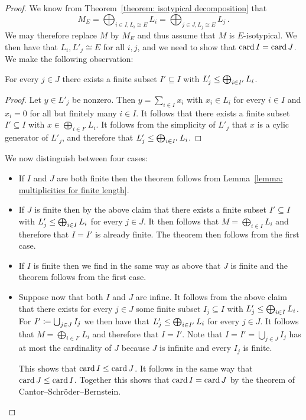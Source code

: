 \begin{proof}
  We know from Theorem~\ref{theorem: isotypical decomposition} that
  \[
      M_E
    = \bigoplus_{i \in I, L_i \cong E} L_i
    = \bigoplus_{j \in J, L_j \cong E} L_j \,.
  \]
  We may therefore replace $M$ by $M_E$ and thus assume that $M$ is $E$-isotypical.
  We then have that $L_i, L'_j \cong E$ for all $i, j$, and we need to show that $\operatorname{card}{I} = \operatorname{card}{J}$.
  We make the following observation:
  
  \begin{claim}
    For every $j \in J$ there exists a finite subset $I' \subseteq I$ with $L'_j \leq \bigoplus_{i \in I'} L_i$.
  \end{claim}
  
  \begin{proof}
    Let $y \in L'_j$ be nonzero.
    Then $y = \sum_{i \in I} x_i$ with $x_i \in L_i$ for every $i \in I$ and $x_i = 0$ for all but finitely many $i \in I$.
    It follows that there exists a finite subset $I' \subseteq I$ with $x \in \bigoplus_{i \in I'} L_i$.
    It follows from the simplicity of $L'_j$ that $x$ is a cylic generator of $L'_j$, and therefore that $L'_j \leq \bigoplus_{i \in I'} L_i$.
  \end{proof}
  
  We now distinguish between four cases:
  \begin{itemize}
    \item 
      If $I$ and $J$ are both finite then the theorem follows from Lemma~\ref{lemma: multiplicities for finite length}.
    \item
      If $J$ is finite then by the above claim that there exists a finite subset $I' \subseteq I$ with $L'_j \leq \bigoplus_{i \in I} L_i$ for every $j \in J$.
      It then follows that $M = \bigoplus_{i \in I} L_i$ and therefore that $I = I'$ is already finite.
      The theorem then follows from the first case.
    \item
      If $I$ is finite then we find in the same way as above that $J$ is finite and the theorem follows from the first case.
    \item
      Suppose now that both $I$ and $J$ are infine.
      It follows from the above claim that there exists for every $j \in J$ some finite subset $I_j \subseteq I$ with $L'_j \leq \bigoplus_{i \in I} L_i$.
      For $I' \coloneqq \bigcup_{j \in J} I_j$ we then have that $L'_j \leq \bigoplus_{i \in I'} L_i$ for every $j \in J$.
      It follows that $M = \bigoplus_{i \in I'} L_i$ and therefore that $I = I'$.
      Note that $I = I' = \bigcup_{j \in J} I_j$ has at most the cardinality of $J$ because $J$ is infinite and every $I_j$ is finite.
      
      This shows that $\operatorname{card}{I} \leq \operatorname{card}{J}$.
      It follows in the same way that $\operatorname{card}{J} \leq \operatorname{card}{I}$.
      Together this shows that $\operatorname{card}{I} = \operatorname{card}{J}$ by the theorem of Cantor--Schröder--Bernstein.
    \qedhere
  \end{itemize}
\end{proof}


